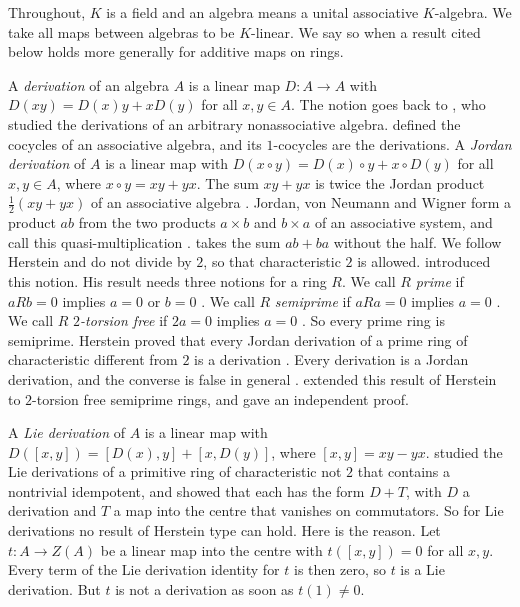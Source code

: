 \documentclass[]{interact}
\theoremstyle{plain}
\theoremstyle{definition}
\theoremstyle{remark}
\begin{document}
Throughout, $K$ is a field and an algebra means a unital associative $K$-algebra.
We take all maps between algebras to be $K$-linear.
We say so when a result cited below holds more generally for additive maps on rings.

A \emph{derivation} of an algebra $A$ is a linear map $D \colon A \to A$ with $D(xy) = D(x)y + xD(y)$ for all $x, y \in A$.
The notion goes back to \citet[Part I]{Jacobson1937}, who studied the derivations of an arbitrary nonassociative algebra.
\citet[\S\S2 and 4]{Hochschild1945} defined the cocycles of an associative algebra, and its $1$-cocycles are the derivations.
A \emph{Jordan derivation} of $A$ is a linear map with $D(x \circ y) = D(x) \circ y + x \circ D(y)$ for all $x, y \in A$, where $x \circ y = xy + yx$.
The sum $xy + yx$ is twice the Jordan product $\tfrac12 (xy + yx)$ of an associative algebra \citep[Example 2.1]{BresarZelmanov2025}.
Jordan, von Neumann and Wigner form a product $ab$ from the two products $a \times b$ and $b \times a$ of an associative system, and call this quasi-multiplication \citep[p.~64]{JordanVonNeumannWigner1934}.
\citet[p.~1104]{Herstein1957} takes the sum $ab + ba$ without the half.
We follow Herstein and do not divide by $2$, so that characteristic $2$ is allowed.
\citet[p.~1104]{Herstein1957} introduced this notion.
His result needs three notions for a ring $R$.
We call $R$ \emph{prime} if $aRb = 0$ implies $a = 0$ or $b = 0$ \citep[p.~1003]{Bresar1988}.
We call $R$ \emph{semiprime} if $aRa = 0$ implies $a = 0$ \citep[p.~1003]{Bresar1988}.
We call $R$ \emph{$2$-torsion free} if $2a = 0$ implies $a = 0$ \citep[p.~1003]{Bresar1988}.
So every prime ring is semiprime.
Herstein proved that every Jordan derivation of a prime ring of characteristic different from $2$ is a derivation \citep[Theorem 3.1]{Herstein1957}.
Every derivation is a Jordan derivation, and the converse is false in general \citep[p.~1003]{Bresar1988}.
\citet[Corollary 5]{Cusack1975} extended this result of Herstein to $2$-torsion free semiprime rings, and \citet[Theorem 1]{Bresar1988} gave an independent proof.

A \emph{Lie derivation} of $A$ is a linear map with $D([x,y]) = [D(x), y] + [x, D(y)]$, where $[x,y] = xy - yx$.
\citet[p.~183]{Martindale1964} studied the Lie derivations of a primitive ring of characteristic not $2$ that contains a nontrivial idempotent, and showed that each has the form $D + T$, with $D$ a derivation and $T$ a map into the centre that vanishes on commutators.
So for Lie derivations no result of Herstein type can hold.
Here is the reason.
Let $t \colon A \to Z(A)$ be a linear map into the centre with $t([x,y]) = 0$ for all $x, y$.
Every term of the Lie derivation identity for $t$ is then zero, so $t$ is a Lie derivation.
But $t$ is not a derivation as soon as $t(1) \neq 0$.
\end{document}
